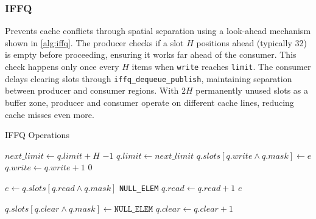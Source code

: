 \subsubsection{\acl{IFFQ}}
Prevents cache conflicts through spatial separation using a look-ahead mechanism shown in \cref{alg:iffq}. The producer checks if a slot $H$ positions ahead (typically 32) is empty before proceeding, ensuring it works far ahead of the consumer. This check happens only once every $H$ items when \texttt{write} reaches \texttt{limit}. The consumer delays clearing slots through \texttt{iffq\_dequeue\_publish}, maintaining separation between producer and consumer regions. With $2H$ permanently unused slots as a buffer zone, producer and consumer operate on different cache lines, reducing cache misses even more. \cite{MaffioneCacheAware}

\begin{algorithm}[!ht]
   \centering
   \captionsetup{justification=centering}
   \caption{\acl{IFFQ} Operations \cite{MaffioneCacheAware}}
   \label{alg:iffq}
   \scriptsize
   \begin{algorithmic}[1]
            
               \State $next\_limit \gets q.limit + H$
                   \State \Return $-1$ 
               \EndIf
               \State $q.limit \gets next\_limit$ 
           \EndIf
           \State $q.slots[q.write \land q.mask] \gets e$
           \State $q.write \gets q.write + 1$
           \State \Return $0$
       \EndFunction
       
       \State
       
           \State $e \gets q.slots[q.read \land q.mask]$
               \State \Return \texttt{NULL\_ELEM}
           \EndIf
           \State $q.read \gets q.read + 1$
           \State \Return $e$
       \EndFunction
       
       \State
       
               \State $q.slots[q.clear \land q.mask] \gets \texttt{NULL\_ELEM}$
               \State $q.clear \gets q.clear + 1$
           \EndWhile
       \EndFunction
   \end{algorithmic}
\end{algorithm}

